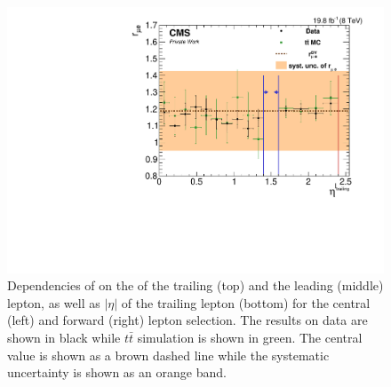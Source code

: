 \begin{figure}[htbp]
\begin{minipage}[t]{0.49\textwidth}
\end{minipage}
\begin{minipage}[t]{0.49\textwidth}
\includegraphics[width=\textwidth]{plots/BG/rmue/8TeVrRatioDataVsMCControl_eta1_Forward_Full2012.pdf}
\end{minipage}
\caption{Dependencies of \rmue on the \pt of the trailing (top) and the leading (middle) lepton, as well as $|\eta|$ of the trailing lepton (bottom) for the central (left) and forward (right) lepton selection. The results on data are shown in black while $t\bar{t}$ simulation is shown in green. The central value is shown as a brown dashed line while the systematic uncertainty is shown as an orange band.}
\label{fig:rmueDependenciesApp1}
\end{figure} 

